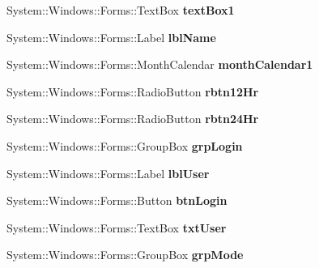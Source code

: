 \begin{DoxyCompactItemize}
System\+::\+Windows\+::\+Forms\+::\+Text\+Box {\bfseries text\+Box1}
\item 
\mbox{\label{class_project1_1_1_my_form_a431b01cec8d89f56a1742be644e3ecbe}} 
System\+::\+Windows\+::\+Forms\+::\+Label {\bfseries lbl\+Name}
\item 
\mbox{\label{class_project1_1_1_my_form_ac75c4cc930c4b7eb4ae0170c8a57520e}} 
System\+::\+Windows\+::\+Forms\+::\+Month\+Calendar {\bfseries month\+Calendar1}
\item 
\mbox{\label{class_project1_1_1_my_form_ae150ca30d31ebf54ad4e15eebf6a09be}} 
System\+::\+Windows\+::\+Forms\+::\+Radio\+Button {\bfseries rbtn12\+Hr}
\item 
\mbox{\label{class_project1_1_1_my_form_a84ab0b58c10cfee02a111a35c215d0f1}} 
System\+::\+Windows\+::\+Forms\+::\+Radio\+Button {\bfseries rbtn24\+Hr}
\item 
\mbox{\label{class_project1_1_1_my_form_a6113fc2378c35d7af93188d011ebb726}} 
System\+::\+Windows\+::\+Forms\+::\+Group\+Box {\bfseries grp\+Login}
\item 
\mbox{\label{class_project1_1_1_my_form_a273ef9114121c59f96d76cee3ae4dc41}} 
System\+::\+Windows\+::\+Forms\+::\+Label {\bfseries lbl\+User}
\item 
\mbox{\label{class_project1_1_1_my_form_a5573b1cc9db4912682bf16fb255b691e}} 
System\+::\+Windows\+::\+Forms\+::\+Button {\bfseries btn\+Login}
\item 
\mbox{\label{class_project1_1_1_my_form_a32bfe8ddb31664bd6e964b1af5fbcc0b}} 
System\+::\+Windows\+::\+Forms\+::\+Text\+Box {\bfseries txt\+User}
\item 
\mbox{\label{class_project1_1_1_my_form_ae1b36bc7a012aa950de384cc1d6274ef}} 
System\+::\+Windows\+::\+Forms\+::\+Group\+Box {\bfseries grp\+Mode}
\item 
\mbox{\label{class_project1_1_1_my_form_afa241eeb546d5be0becca88f9a53910d}} 

\end{DoxyCompactItemize}
